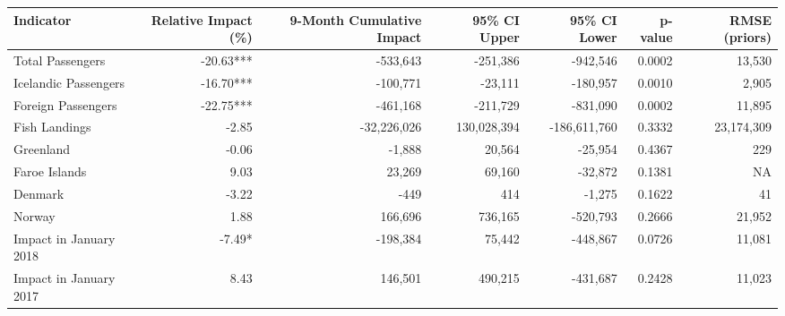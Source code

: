 \begin{tabular}[t]{lrrrrrr}
\toprule
Indicator & Relative Impact (\%) & 9-Month Cumulative Impact & 95\% CI Upper & 95\% CI Lower & p-value & RMSE (priors)\\
\midrule
Total Passengers & -20.63*** & -533,643 & -251,386 & -942,546 & 0.0002 & 13,530\\
Icelandic Passengers & -16.70*** & -100,771 & -23,111 & -180,957 & 0.0010 & 2,905\\
Foreign Passengers & -22.75*** & -461,168 & -211,729 & -831,090 & 0.0002 & 11,895\\
\midrule
Fish Landings & -2.85 & -32,226,026 & 130,028,394 & -186,611,760 & 0.3332 & 23,174,309\\
\midrule
Greenland & -0.06 & -1,888 & 20,564 & -25,954 & 0.4367 & 229\\
Faroe Islands & 9.03 & 23,269 & 69,160 & -32,872 & 0.1381 & NA\\
Denmark & -3.22 & -449 & 414 & -1,275 & 0.1622 & 41\\
Norway & 1.88 & 166,696 & 736,165 & -520,793 & 0.2666 & 21,952\\
\midrule
Impact in January 2018 & -7.49* & -198,384 & 75,442 & -448,867 & 0.0726 & 11,081\\
Impact in January 2017 & 8.43 & 146,501 & 490,215 & -431,687 & 0.2428 & 11,023\\
\bottomrule
\end{tabular}
